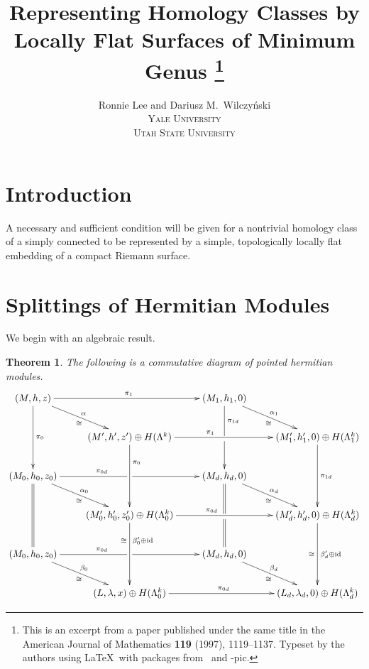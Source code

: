 \documentclass[11pt]{article}
\title{\huge 
	Representing Homology Classes by Locally Flat
	Surfaces of Minimum Genus%
\thanks{This is an excerpt from a paper published under the same title
in the American Journal of Mathematics \textbf{119} (1997), 1119--1137.
Typeset by the authors using \LaTeX\ 
with packages from \AmS\ and \Xy-pic.}
}
\author{Ronnie Lee and Dariusz M.~Wilczy\'{n}ski\\
\small\scshape Yale University\\
\small\scshape Utah State University}
\date{}
\newtheorem{thm}{Theorem}
\begin{document}
\maketitle
\thispagestyle{empty}

\section{Introduction}

A necessary and sufficient condition will be given for a nontrivial homology class
of a simply connected \text{4-manifold} to be represented by a simple, topologically
locally flat embedding of a compact Riemann surface.

\section{Splittings of Hermitian Modules}

We begin with an algebraic result.

\begin{thm}
The following is a commutative diagram of pointed hermitian modules.\\
 \[\xymatrix{
 (M,h,z) \ar[dd]^{\pi_0} \ar[dr]^\alpha_\cong \ar[rr]^{\pi_1}
 && (M_1,h_1,0) \ar'[d]^-{\pi_{1d}}[dd] \ar[dr]^{\alpha_1}_\cong
 \\
 & (M',h',z')\oplus H(\Lambda^k) \ar[dd]^<(.25){\pi_0} \ar[rr]^<(.25){\pi_1}
 && (M'_1,h'_1,0)\oplus H(\Lambda_1^k) \ar[dd]^{\pi_{1d}}
 \\
 (M_0,h_0,z_0) \ar@{=}[dd] \ar[dr]^{\alpha_0}_\cong \ar'[r]^<(.6){\pi_{0d}}[rr]
 && (M_d,h_d,0) \ar@{=}'[d][dd] \ar[dr]^{\alpha_d}_\cong
 \\
 & (M'_0,h'_0,z'_0)\oplus H(\Lambda_0^k) \ar[dd]^<(.25){\beta'_0\oplus\text{id}}_<(.25)\cong
\ar[rr]^<(.25){\pi_{0d}}
 && (M'_d,h'_d,0)\oplus H(\Lambda_d^k) \ar[dd]^{\beta'_d\oplus\text{id}}_\cong
 \\
 (M_0,h_0,z_0) \ar[dr]^{\beta_0}_\cong \ar'[r]^<(.6){\pi_{0d}}[rr]
 && (M_d,h_d,0) \ar[dr]^{\beta_d}_\cong
 \\
 & (L,\lambda,x)\oplus H(\Lambda_0^k) \ar[rr]^{\pi_{0d}}
 && (L_d,\lambda_d,0)\oplus H(\Lambda_d^k)
 }\]
\end{thm}

\vphantom{X}
\end{document}
